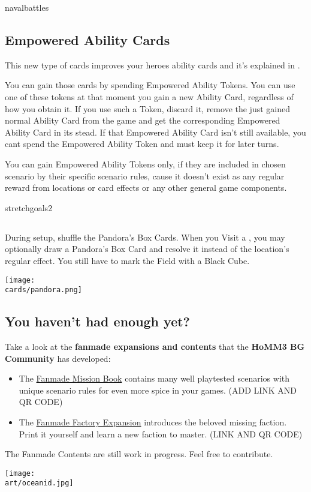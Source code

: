 \begin{multicols*}{2}
\begin{expansion}{navalbattles}
  \subsection*{Empowered Ability Cards}
  This new type of cards improves your heroes ability cards and it's explained in .

  You can gain those cards by spending Empowered Ability Tokens.
  You can use one of these tokens at that moment you gain a new Ability Card, regardless of how you obtain it.
  If you use such a Token, discard it, remove the just gained normal Ability Card from the game and get the corresponding Empowered Ability Card in its stead.
  If that Empowered Ability Card isn't still available, you cant spend the Empowered Ability Token and must keep it for later turns.

  You can gain Empowered Ability Tokens only, if they are included in chosen scenario by their specific scenario rules, cause it doesn't exist as any regular reward from locations or card effects or any other general game components.
\end{expansion}

\begin{expansion}{stretchgoals2}
  \subsection*{}
  During setup, shuffle the Pandora's Box Cards.
  When you Visit a , you may optionally draw a Pandora's Box Card and resolve it instead of the location's regular effect.
  You still have to mark the Field with a Black Cube.

  \medskip
  \begin{center}
    \texttt{[image: \\cards/pandora.png]}
  \end{center}
\end{expansion}

\vspace*{1em}
\subsection*{You haven't had enough yet?}
Take a look at the \textbf{fanmade expansions and contents} that the \textbf{HoMM3 BG Community} has developed:
  \begin{itemize}
    \item The \href{https://github.com/qwrtln/Homm3BG-mission-book}{Fanmade Mission Book} contains many well playtested scenarios with unique scenario rules for even more spice in your games. (ADD LINK AND QR CODE)
	\item The \href{https://github.com/piotrbruzda/Homm3BG-FactoryRulebook}{Fanmade Factory Expansion} introduces the beloved missing faction. Print it yourself and learn a new faction to master. (LINK AND QR CODE)
  \end{itemize}
The Fanmade Contents are still work in progress. Feel free to contribute.

\texttt{[image: \\art/oceanid.jpg]}

\end{multicols*}
